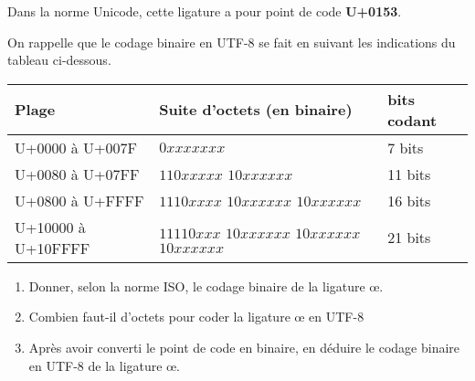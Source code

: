\documentclass[11pt,a4paper]{article}
\begin{document}
Dans la norme Unicode, cette ligature a pour point de code \textbf{U+0153}.

On rappelle que le codage binaire en UTF-8 se fait en suivant les indications du tableau ci-dessous.
\begin{center}
\begin{tabular}{|C{4cm}|L{8cm}|L{2cm}|}\hline
Plage & Suite d'octets (en binaire) & bits codant\\\hline
U+0000 à U+007F & $0xxx xxxx$ & 7 bits\\
U+0080 à U+07FF & $110x xxxx$ $10xx xxxx$ & 11 bits\\
U+0800 à U+FFFF & $1110 xxxx$ $10xx xxxx$ $10xx xxxx$ & 16 bits\\
U+10000 à U+10FFFF & $1111 0xxx$ $10xx xxxx$ $10xx xxxx$ $10xx xxxx$ & 21 bits\\\hline
\end{tabular}
\end{center}

\begin{enumerate}
\item Donner, selon la norme ISO, le codage binaire de la ligature \oe.
\item Combien faut-il d'octets pour coder la ligature {\oe} en UTF-8
\item Après avoir converti le point de code en binaire, en déduire le codage binaire en UTF-8 de la ligature {\oe}.
\end{enumerate}
\end{document}
